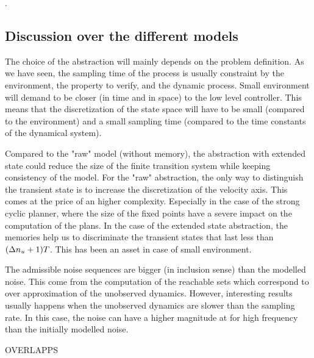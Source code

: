 .


\subsection{Discussion over the different models}
The choice of the abstraction will mainly depends on the problem definition.
As we have seen, the sampling time of the process is usually constraint by the environment, the property to verify, and the dynamic process. Small environment will demand to be closer (in time and in space) to the low level controller. This means that the discretization of the state space will have to be small (compared to the environment) and a small sampling time (compared to the time constants of the dynamical system).

Compared to the "raw" model (without memory), the abstraction with extended state could reduce the size of the finite transition system while keeping consistency of the model.
For the "raw" abstraction, the only way to distinguish the transient state is to increase the discretization of the velocity axis. This comes at the price of an higher complexity. Especially in the case of the strong cyclic planner, where the size of the fixed points have a severe impact on the computation of the plans.
In the case of the extended state abstraction, the memories help us to discriminate the transient states that last less than $(\Delta n_u+1)T$.
This has been an asset in case of small environment.

The admissible noise sequences are bigger (in inclusion sense) than the modelled noise. This come from the computation of the reachable sets which correspond to over approximation of the unobserved dynamics.
However, interesting results usually happens when the unobserved dynamics are slower than the sampling rate.
In this case, the noise can have a higher magnitude at for high frequency than the initially modelled noise.

OVERLAPPS